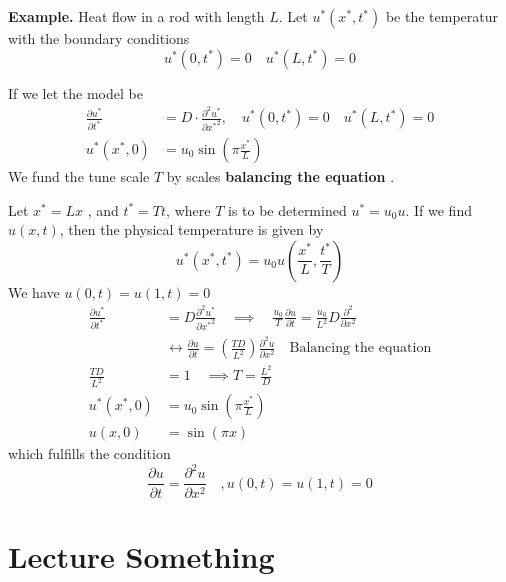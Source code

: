 \documentclass{article}
\theoremstyle{remark}
\begin{document}
\begin{tcolorbox}
  \textbf{Example.} Heat flow in a rod with length $L$. Let $u^{*} \left( x^{*}, t^{*} \right)$ be the temperatur with the boundary conditions \[
  u^{*}\left( 0, t^{*} \right) = 0 \quad  u^{*}\left( L, t^{*} \right) = 0 
  \] 

  If we let the model be \[
    \begin{split}
    \frac{\partial u^{*}}{\partial t^{*}}   & = D \cdot  \frac{\partial ^2 u^{*}}{\partial {x^{*} }^2},  \quad   u^{*}\left( 0, t^{*} \right) = 0 \quad  u^{*}\left( L, t^{*} \right) = 0 \\
 u^{*}\left( x^{*}, 0 \right)   & = u_{0} \sin \left( \pi  \frac{x^{*}}{ L}  \right) 
    \end{split} 
  \] 
  We fund the tune scale $T$ by scales \textbf{balancing the equation} . 
  \par Let $x^{*} = Lx$ , and $t^{*} = Tt$, where $T$ is to be determined $u^{*} = u_{0} u$. If we find $u\left( x,t \right) $,  then the physical temperature is given by \[
    u^{*}\left( x^{*} , t^{*} \right) = u_{0} u\left( \frac{x^{*}}{L} , \frac{t^{*}}{T}  \right)
  \]  
  We have $u\left( 0,t \right) = u\left( 1,t \right) = 0$ \[
    \begin{split}
  \frac{\partial u^{*}}{\partial t^{*}}   & = D \frac{\partial ^2 u^{*}}{\partial {x^{*}}^2}  \quad  \implies  \quad  \frac{u_{0}}{T}  \frac{\partial u}{\partial t}  = \frac{u_{0}}{L^2} D \frac{\partial ^2}{\partial x^2}    \\
    & \leftrightarrow  \frac{\partial u}{\partial  t}   = \left( \frac{T D}{L^2}  \right) \frac{\partial ^2 u}{\partial x ^2}  \quad  \text{Balancing the equation}   \\
      \frac{TD}{ L^2}    & = 1 \quad \implies  T = \frac{L^2}{D}   \\
     u^{*}\left( x^{*}, 0 \right) &=  u_{0} \sin \left( \pi \frac{x^{*}}{L}  \right)  \\
     u\left( x, 0 \right) &=  \sin \left( \pi x \right) 
    \end{split} 
  \] 
  which fulfills the condition \[
  \frac{\partial u}{\partial t}  = \frac{\partial ^2 u}{\partial  x^2}  \quad  , u\left( 0,t \right) = u\left( 1,t \right) = 0 
  \] 
\end{tcolorbox}



\newpage
\section{Lecture Something}%
\label{sec:lecture_something}
\end{document}
